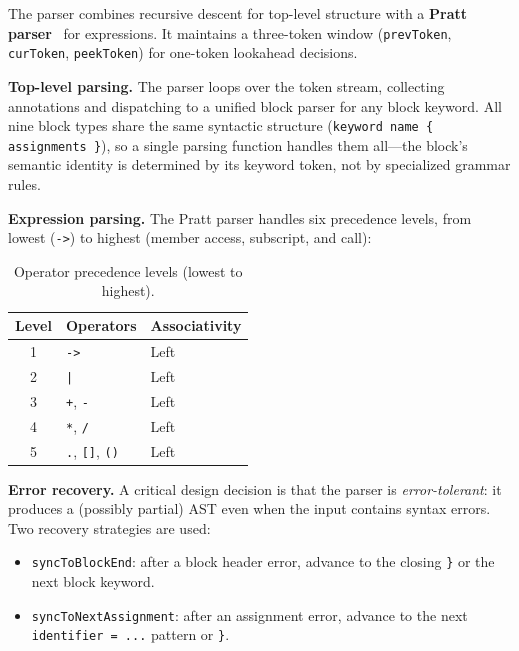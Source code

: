 \documentclass[sigconf,nonacm]{acmart}
\begin{document}
The parser combines recursive descent for top-level structure with a
\textbf{Pratt parser}~\cite{pratt1973} for expressions. It maintains a
three-token window (\texttt{prevToken}, \texttt{curToken},
\texttt{peekToken}) for one-token lookahead decisions.

\noindent\textbf{Top-level parsing.} The parser loops over the token
stream, collecting annotations and dispatching to a unified block parser
for any block keyword. All nine block types share the same syntactic
structure (\texttt{keyword name \{ assignments \}}), so a single parsing
function handles them all---the block's semantic identity is determined
by its keyword token, not by specialized grammar rules.

\noindent\textbf{Expression parsing.} The Pratt parser handles six
precedence levels, from lowest (\texttt{->}) to highest (member access,
subscript, and call):

\begin{table}[t]
\caption{Operator precedence levels (lowest to highest).}
\label{tab:precedence}
\centering
\small
\begin{tabular}{@{}cll@{}}
\toprule
\textbf{Level} & \textbf{Operators} & \textbf{Associativity} \\
\midrule
1 & \texttt{->}             & Left \\
2 & \texttt{|}              & Left \\
3 & \texttt{+}, \texttt{-}  & Left \\
4 & \texttt{*}, \texttt{/}  & Left \\
5 & \texttt{.}, \texttt{[]}, \texttt{()} & Left \\
\bottomrule
\end{tabular}
\end{table}

\noindent\textbf{Error recovery.} A critical design decision is that the
parser is \emph{error-tolerant}: it produces a (possibly partial) AST even
when the input contains syntax errors. Two recovery strategies are used:

\begin{itemize}[leftmargin=*]
  \item \texttt{syncToBlockEnd}: after a block header error, advance to the
        closing \texttt{\}} or the next block keyword.
  \item \texttt{syncToNextAssignment}: after an assignment error, advance to
        the next \texttt{identifier = ...} pattern or \texttt{\}}.
\end{itemize}
\end{document}
